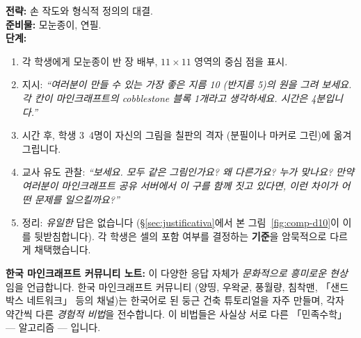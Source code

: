 \documentclass[12pt,a4paper]{scrartcl}
\newcommand{\acc}[1]{\textcolor{accent}{\textbf{#1}}}
\newcommand{\tempo}[1]{\textnormal{\footnotesize\color{bg!90!white}\textsf{#1}}}
\begin{document}
\begin{hwaldong}[1.2 --- 문제 제기 \quad\tempo{15분}]
\textbf{전략:} 손 작도와 형식적 정의의 대결. \\[0.4em]
\textbf{준비물:} 모눈종이, 연필. \\[0.4em]
\textbf{단계:}
\begin{enumerate}[leftmargin=1.5em,itemsep=0.2em,topsep=0.3em,nosep]
  \item 각 학생에게 모눈종이 반 장 배부, $11 \times 11$ 영역의 중심 점을 표시.
  \item 지시: \emph{\enquote{여러분이 만들 수 있는 가장 좋은 지름 10 (반지름 5)의 원을 그려 보세요. \emph{각 칸이 마인크래프트의 cobblestone 블록 1개라고 생각하세요.} 시간은 4분입니다.}}
  \item 시간 후, 학생 3~4명이 자신의 그림을 칠판의 격자 (분필이나 마커로 그린)에 옮겨 그립니다.
  \item 교사 유도 관찰: \emph{\enquote{보세요. 모두 같은 그림인가요? 왜 다른가요? 누가 맞나요? 만약 여러분이 마인크래프트 공유 서버에서 이 구를 함께 짓고 있다면, 이런 차이가 어떤 문제를 일으킬까요?}}
  \item 정리: \emph{유일한} 답은 없습니다 (§\ref{sec:justificativa}에서 본 그림~\ref{fig:comp-d10}이 이를 뒷받침합니다). 각 학생은 셀의 포함 여부를 결정하는 \acc{기준}을 암묵적으로 다르게 채택했습니다.
\end{enumerate}

\textbf{한국 마인크래프트 커뮤니티 노트:} 이 다양한 응답 자체가 \emph{문화적으로 흥미로운 현상}임을 언급합니다. 한국 마인크래프트 커뮤니티 (양띵, 우왁굳, 풍월량, 침착맨, 「샌드박스 네트워크」 등의 채널)는 한국어로 된 둥근 건축 튜토리얼을 자주 만들며, 각자 약간씩 다른 \emph{경험적 비법}을 전수합니다. 이 비법들은 사실상 서로 다른 「민족수학」 — 알고리즘 — 입니다.
\end{hwaldong}
\end{document}
